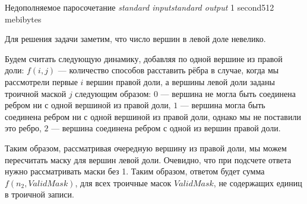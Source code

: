 \begin{problem}{Недополняемое паросочетание}
{\textsl{standard input}}{\textsl{standard output}}
{1 second}{512 mebibytes}{}

Для решения задачи заметим, что число вершин в левой доле невелико. 

Будем считать следующую динамику, добавляя по одной вершине из правой доли:
$f(i,j)$ --- количество способов расставить рёбра в случае, когда мы рассмотрели первые $i$ вершин правой доли, а вершины левой доли
заданы троичной маской $j$ следующим образом: $0$ --- вершина не могла быть соединена ребром ни с одной вершиной из правой доли, $1$ --- вершина могла быть соединена ребром ни с одной вершиной из правой доли, однако мы не поставили это ребро, $2$ --- вершина соединена ребром с одной из вершин правой доли. 

Таким образом, рассматривая очередную вершину из правой доли, мы можем пересчитать маску для вершин левой доли. Очевидно, что при подсчете ответа нужно рассматривать маски без 1. Таким образом, ответом будет сумма 
$f(n_2, ValidMask)$, для всех троичные масок $ValidMask$, не содержащих единиц в троичной записи.

\end{problem}

